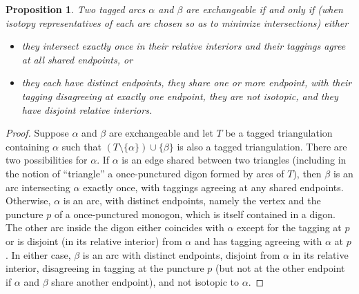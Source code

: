\documentclass{amsart}
\newtheorem{proposition}{Proposition}[section]
\theoremstyle{definition}
\theoremstyle{remark}
\numberwithin{equation}{section}
\newcommand{\set}[1]{{\lbrace #1 \rbrace}}
\newcommand{\0}{{\mathbf{0}}}
\begin{document}
\begin{proposition}\label{exch char}
Two tagged arcs $\alpha$ and $\beta$ are exchangeable if and only if (when isotopy representatives of each are chosen so as to minimize intersections) either
\begin{itemize}
\item they intersect exactly once in their relative interiors and their taggings agree at all shared endpoints, or
\item they each have distinct endpoints, they share one or more endpoint, with their tagging disagreeing at exactly one endpoint, they are not isotopic, and they have disjoint relative interiors.
\end{itemize}
\end{proposition}
\begin{proof}
Suppose $\alpha$ and $\beta$ are exchangeable and let $T$ be a tagged triangulation containing $\alpha$ such that $(T\setminus\set{\alpha})\cup\set{\beta}$ is also a tagged triangulation.
There are two possibilities for $\alpha$.
If $\alpha$ is an edge shared between two triangles (including in the notion of ``triangle'' a once-punctured digon formed by arcs of $T$), then $\beta$ is an arc intersecting $\alpha$ exactly once, with taggings agreeing at any shared endpoints.
Otherwise, $\alpha$ is an arc, with distinct endpoints, namely the vertex and the puncture $p$ of a once-punctured monogon, which is itself contained in a digon.
The other arc inside the digon either coincides with $\alpha$ except for the tagging at $p$ or is disjoint (in its relative interior) from $\alpha$ and has tagging agreeing with $\alpha$ at $p$.
In either case, $\beta$ is an arc with distinct endpoints, disjoint from $\alpha$ in its relative interior, disagreeing in tagging at the puncture $p$ (but not at the other endpoint if $\alpha$ and $\beta$ share another endpoint), and not isotopic to $\alpha$.


\end{proof}
\end{document}
